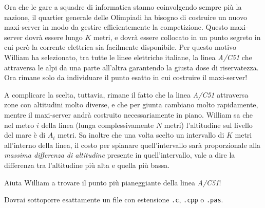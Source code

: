 \usepackage{xcolor}
\usepackage{afterpage}
\usepackage{pifont,mdframed}
\usepackage[bottom]{footmisc}

\makeatletter
\gdef\this@inputfilename{input.txt}
\gdef\this@outputfilename{output.txt}
\makeatother

\newcommand{\inputfile}{\texttt{input.txt}}
\newcommand{\outputfile}{\texttt{output.txt}}

\newenvironment{warning}
  {\par\begin{mdframed}[linewidth=2pt,linecolor=gray]%
    \begin{list}{}{\leftmargin=1cm
                   \labelwidth=\leftmargin}\item[\Large\ding{43}]}
  {\end{list}\end{mdframed}\par}

	Ora che le gare a squadre di informatica stanno coinvolgendo sempre più la nazione, il quartier generale delle Olimpiadi ha bisogno di costruire un nuovo maxi-server in modo da gestire efficientemente la competizione. Questo maxi-server dovrà essere lungo $K$ metri, e dovrà essere collocato in un punto segreto in cui però la corrente elettrica sia facilmente disponibile. Per questo motivo William ha selezionato, tra tutte le linee elettriche italiane, la linea \emph{A/C51} che attraversa le alpi da una parte all'altra garantendo la giusta dose di riservatezza. Ora rimane solo da individuare il punto esatto in cui costruire il maxi-server!

	A complicare la scelta, tuttavia, rimane il fatto che la linea \emph{A/C51} attraversa zone con altitudini molto diverse, e che per giunta cambiano molto rapidamente, mentre il maxi-server andrà costruito necessariamente in piano. William sa che nel metro $i$ della linea (lunga complessivamente $N$ metri) l'altitudine sul livello del mare è di $A_i$ metri. Sa inoltre che una volta scelto un intervallo di $K$ metri all'interno della linea, il costo per spianare quell'intervallo sarà proporzionale alla \emph{massima differenza di altitudine} presente in quell'intervallo, vale a dire la differenza tra l'altitudine più alta e quella più bassa.
	
	Aiuta William a trovare il punto più pianeggiante della linea \emph{A/C51}!


\Implementation
Dovrai sottoporre esattamente un file con estensione \texttt{.c}, \texttt{.cpp} o \texttt{.pas}.

